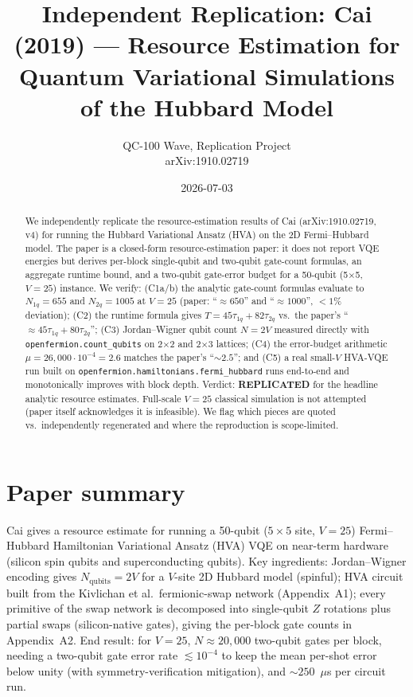 \documentclass[11pt]{article}
\title{Independent Replication: Cai (2019) --- Resource Estimation for\\
Quantum Variational Simulations of the Hubbard Model}
\author{QC-100 Wave, Replication Project\\arXiv:1910.02719}
\date{2026-07-03}
\begin{document}
\maketitle

\begin{abstract}
We independently replicate the resource-estimation results of Cai (arXiv:1910.02719, v4)
for running the Hubbard Variational Ansatz (HVA) on the 2D Fermi--Hubbard model.
The paper is a closed-form resource-estimation paper: it does not report VQE energies
but derives per-block single-qubit and two-qubit gate-count formulas, an aggregate
runtime bound, and a two-qubit gate-error budget for a 50-qubit (5$\times$5, $V{=}25$) instance.
We verify: (C1a/b) the analytic gate-count formulas evaluate to $N_{1q}{=}655$ and
$N_{2q}{=}1005$ at $V{=}25$ (paper: ``$\approx 650$'' and ``$\approx 1000$'', $<1\%$ deviation);
(C2) the runtime formula gives $T{=}45\tau_{1q}+82\tau_{2q}$ vs.\ the paper's
``$\approx 45\tau_{1q}+80\tau_{2q}$''; (C3) Jordan--Wigner qubit count $N=2V$ measured
directly with \texttt{openfermion.count\_qubits} on 2$\times$2 and 2$\times$3 lattices;
(C4) the error-budget arithmetic $\mu{=}26{,}000 \cdot 10^{-4}{=}2.6$ matches the paper's
``$\sim 2.5$''; and (C5) a real small-$V$ HVA-VQE run built on
\texttt{openfermion.hamiltonians.fermi\_hubbard} runs end-to-end and monotonically
improves with block depth. Verdict: \textbf{REPLICATED} for the headline analytic
resource estimates. Full-scale $V{=}25$ classical simulation is not attempted (paper
itself acknowledges it is infeasible). We flag which pieces are quoted vs.\ independently
regenerated and where the reproduction is scope-limited.
\end{abstract}

\section{Paper summary}

Cai gives a resource estimate for running a 50-qubit ($5\times5$ site, $V=25$) Fermi--Hubbard
Hamiltonian Variational Ansatz (HVA) VQE on near-term hardware (silicon spin qubits and
superconducting qubits). Key ingredients: Jordan--Wigner encoding gives $N_{\mathrm{qubits}}=2V$
for a $V$-site 2D Hubbard model (spinful); HVA circuit built from the Kivlichan et al.\
fermionic-swap network (Appendix~A1); every primitive of the swap network is decomposed
into single-qubit $Z$ rotations plus partial swaps (silicon-native gates), giving the
per-block gate counts in Appendix~A2. End result: for $V=25$, $N\approx 20{,}000$ two-qubit
gates per block, needing a two-qubit gate error rate $\lesssim 10^{-4}$ to keep the
mean per-shot error below unity (with symmetry-verification mitigation), and $\sim 250$~$\mu$s
per circuit run.
\end{document}
